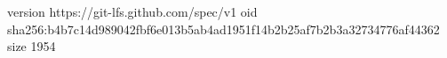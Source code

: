 version https://git-lfs.github.com/spec/v1
oid sha256:b4b7c14d989042fbf6e013b5ab4ad1951f14b2b25af7b2b3a32734776af44362
size 1954

